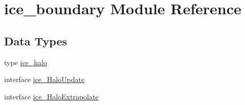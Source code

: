 \hypertarget{namespaceice__boundary}{
\section{ice\_\-boundary Module Reference}
\label{namespaceice__boundary}
}
\subsection*{Data Types}
\begin{DoxyCompactItemize}
\item 
type \hyperlink{typeice__boundary_1_1ice__halo}{ice\_\-halo}
\item 
interface \hyperlink{interfaceice__boundary_1_1ice__HaloUpdate}{ice\_\-HaloUpdate}
\item 
interface \hyperlink{interfaceice__boundary_1_1ice__HaloExtrapolate}{ice\_\-HaloExtrapolate}
\end{DoxyCompactItemize}

